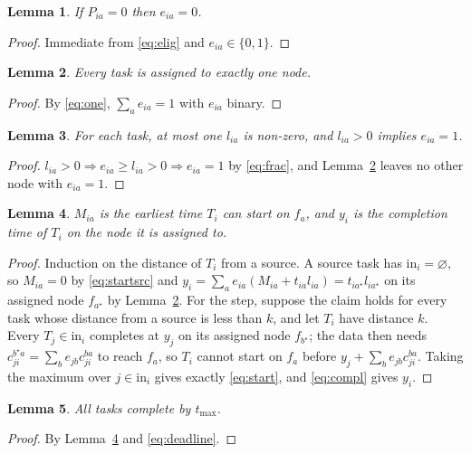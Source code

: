 \documentclass[conference]{IEEEtran}
\newtheorem{lemma}{Lemma}
\begin{document}
\begin{lemma}
\label{lem:elig}
If $P_{ia}=0$ then $e_{ia}=0$.
\end{lemma}
\begin{proof}
Immediate from \eqref{eq:elig} and $e_{ia}\in\{0,1\}$.
\end{proof}

\begin{lemma}
\label{lem:one}
Every task is assigned to exactly one node.
\end{lemma}
\begin{proof}
By \eqref{eq:one}, $\sum_a e_{ia}=1$ with $e_{ia}$ binary.
\end{proof}

\begin{lemma}
\label{lem:frac}
For each task, at most one $l_{ia}$ is non-zero, and $l_{ia}>0$ implies $e_{ia}=1$.
\end{lemma}
\begin{proof}
$l_{ia}>0\Rightarrow e_{ia}\ge l_{ia}>0\Rightarrow e_{ia}=1$ by \eqref{eq:frac}, and Lemma~\ref{lem:one} leaves no other node with $e_{ia}=1$.
\end{proof}

\begin{lemma}
\label{lem:timing}
$M_{ia}$ is the earliest time $T_i$ can start on $f_a$, and $y_i$ is the completion time of $T_i$ on the node it is assigned to.
\end{lemma}
\begin{proof}
Induction on the distance of $T_i$ from a source. A source task has $\mathrm{in}_i=\varnothing$, so $M_{ia}=0$ by \eqref{eq:startsrc} and $y_i=\sum_a e_{ia}(M_{ia}+t_{ia}l_{ia})=t_{ia^{\star}}l_{ia^{\star}}$ on its assigned node $f_{a^{\star}}$ by Lemma~\ref{lem:one}. For the step, suppose the claim holds for every task whose distance from a source is less than $k$, and let $T_i$ have distance $k$. Every $T_j\in\mathrm{in}_i$ completes at $y_j$ on its assigned node $f_{b^{\star}}$; the data then needs $c_{ji}^{b^{\star}a}=\sum_b e_{jb}c_{ji}^{ba}$ to reach $f_a$, so $T_i$ cannot start on $f_a$ before $y_j+\sum_b e_{jb}c_{ji}^{ba}$. Taking the maximum over $j\in\mathrm{in}_i$ gives exactly \eqref{eq:start}, and \eqref{eq:compl} gives $y_i$.
\end{proof}

\begin{lemma}
\label{lem:deadline}
All tasks complete by $t_{\max}$.
\end{lemma}
\begin{proof}
By Lemma~\ref{lem:timing} and \eqref{eq:deadline}.
\end{proof}
\end{document}
